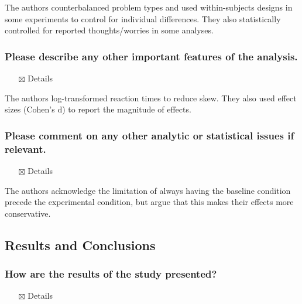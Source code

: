 \documentclass[
  doc, a4paper]{apa7}
\providecommand{\tightlist}{%
  \setlength{\itemsep}{0pt}\setlength{\parskip}{0pt}}
\begin{document}
The authors counterbalanced problem types and used within-subjects designs in some experiments to control for individual differences. They also statistically controlled for reported thoughts/worries in some analyses.

\subsubsection{Please describe any other important features of the analysis.}\label{please-describe-any-other-important-features-of-the-analysis.}

\begin{itemize}
\tightlist
\item[$\boxtimes$]
  Details
\end{itemize}

The authors log-transformed reaction times to reduce skew. They also used effect sizes (Cohen's d) to report the magnitude of effects.

\subsubsection{Please comment on any other analytic or statistical issues if relevant.}\label{please-comment-on-any-other-analytic-or-statistical-issues-if-relevant.}

\begin{itemize}
\tightlist
\item[$\boxtimes$]
  Details
\end{itemize}

The authors acknowledge the limitation of always having the baseline condition precede the experimental condition, but argue that this makes their effects more conservative.

\subsection{Results and Conclusions}\label{results-and-conclusions}

\subsubsection{How are the results of the study presented?}\label{how-are-the-results-of-the-study-presented}

\begin{itemize}
\tightlist
\item[$\boxtimes$]
  Details
\end{itemize}
\end{document}
